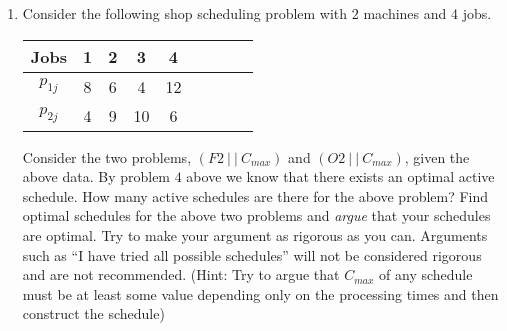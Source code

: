 \documentclass[10pt]{article}
\begin{document}
\begin{enumerate}
\item 
Consider the following shop scheduling problem with $2$ machines and $4$ jobs.
\begin{center}
\begin{tabular}{|c||c|c|c|c|c|c|c|c|}\hline
Jobs & 1 & 2 & 3 & 4 \\ \hline
$p_{1j}$ & 8 & 6 & 4 & 12 \\
$p_{2j}$ & 4 & 9 & 10 & 6 \\
\hline
\end{tabular}
\end{center}
\vspace{0.1in}
Consider the two problems, $(F2~|~|~C_{max})$ and $(O2 ~|~|~C_{max})$,
given the above data. By problem $4$ above we know that there exists an optimal 
active schedule. How many active schedules are there for the above problem?
Find optimal schedules for the above two problems and {\em argue}  that your schedules are optimal. Try to make your argument as rigorous as you can. 
Arguments such as ``I have tried all possible schedules'' will not be considered rigorous and are not recommended.
(Hint: Try to argue that $C_{max}$ of any schedule must be at least some value depending only on the processing times and then construct the schedule)
\end{enumerate}
\end{document}
